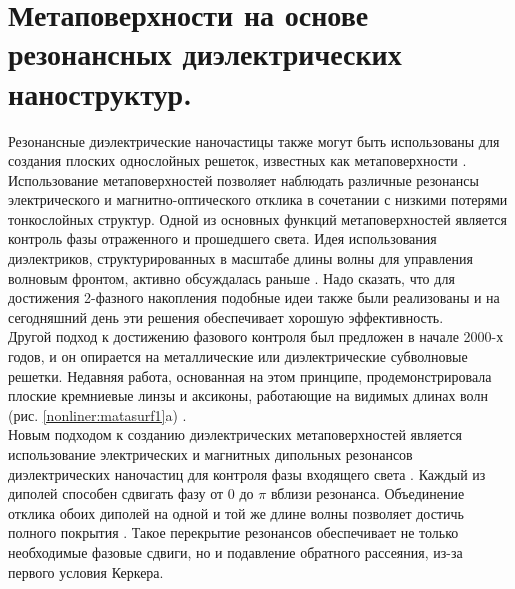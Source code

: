 \section{Метаповерхности на основе резонансных диэлектрических наноструктур.}
\hspace*{2mm}
Резонансные диэлектрические наночастицы также могут быть использованы для создания плоских однослойных решеток, известных как метаповерхности \cite{yu2014flat}. Использование метаповерхностей позволяет наблюдать различные резонансы  электрического и магнитно-оптического отклика в сочетании с низкими потерями тонкослойных структур. Одной из основных функций метаповерхностей является контроль фазы отраженного и прошедшего света. Идея использования диэлектриков, структурированных в масштабе длины волны для управления волновым фронтом, активно обсуждалась раньше \cite{lalanne1999design}. Надо сказать, что для достижения  2-фазного накопления подобные идеи также были реализованы и на сегодняшний день эти решения обеспечивает хорошую эффективность.
\\
\hspace*{2mm}
Другой подход к достижению фазового контроля был предложен в начале 2000-х годов, и он опирается на металлические или диэлектрические субволновые решетки. Недавняя работа, основанная на этом принципе, продемонстрировала плоские кремниевые линзы и аксиконы, работающие на видимых длинах волн (рис.  \ref{nonliner:matasurf1}a) \cite{lin2014dielectric}. 
\\
\hspace*{2mm}
Новым подходом к созданию диэлектрических метаповерхностей является использование электрических и магнитных дипольных резонансов диэлектрических наночастиц для контроля фазы входящего света \cite{shalaev2015high}. Каждый из диполей способен сдвигать фазу от 0 до $\pi$ вблизи резонанса. Объединение отклика обоих диполей на одной и той же длине волны позволяет достичь полного покрытия \cite{decker2015high}. Такое перекрытие резонансов обеспечивает не только необходимые фазовые сдвиги, но и подавление обратного рассеяния, из-за первого условия Керкера.
